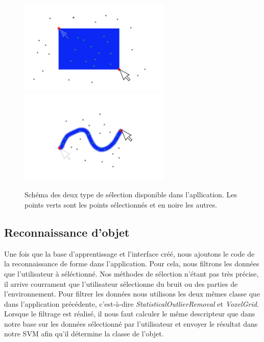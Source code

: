 \begin{figure}[!h]
  \begin{center}
    \includegraphics[height=4.5cm]{image/selection1.png}
    \includegraphics[height=4.5cm]{image/selection2.png}
    \caption{Schéma des deux type de sélection disponible dans l'apllication. Les points verts
    sont les points sélectionnés et en noire les autres.}
  \end{center}
\end{figure}

\subsection{Reconnaissance d'objet}
Une fois que la base d'apprentissage et l'interface créé, nous ajoutons le code de la reconnaissance de forme dans l'application.
Pour cela, nous filtrons les données que l'utilisateur à séléctionné. Nos méthodes de sélection n'étant pas très précise, il arrive
courrament que l'utilisateur sélectionne du bruit ou des parties de l'environnement. Pour filtrer les données nous utilisons
les deux mêmes classe que dans l'application précédente, c'est-à-dire \textit{StatisticalOutlierRemoval} et \textit{VoxelGrid}.
Lorsque le filtrage est réalisé, il nous faut calculer le même descripteur que dans notre base sur les données sélectionné par 
l'utilisateur et envoyer le résultat dans notre SVM afin qu'il détermine la classe de l'objet.

